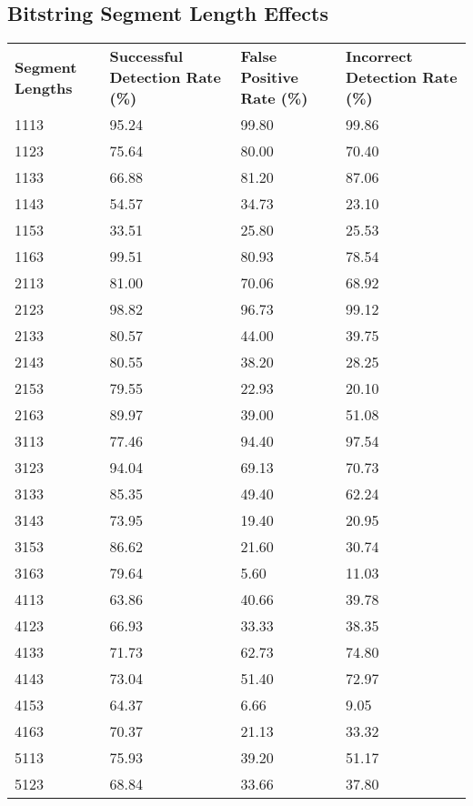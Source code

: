 \begin{appendices}
\newpage
\section{Bitstring Segment Length Effects}

\begin{longtable}{|p{1.5in}|p{1in}|p{1in}|p{1in}|}
	\hline
	\textbf{Segment Lengths} & \textbf{Successful Detection Rate (\%)} & \textbf{False Positive Rate (\%)} & \textbf{Incorrect Detection Rate (\%)}  \\
	\hhline{|=|=|=|=|}
	1113 & 95.24 & 99.80 & 99.86 \\ \hline
	1123 & 75.64 & 80.00 & 70.40 \\ \hline
	1133 & 66.88 & 81.20 & 87.06 \\ \hline
	1143 & 54.57 & 34.73 & 23.10 \\ \hline
	1153 & 33.51 & 25.80 & 25.53 \\ \hline
	1163 & 99.51 & 80.93 & 78.54 \\ \hline
	2113 & 81.00 & 70.06 & 68.92 \\ \hline
	2123 & 98.82 & 96.73 & 99.12 \\ \hline
	2133 & 80.57 & 44.00 & 39.75 \\ \hline
	2143 & 80.55 & 38.20 & 28.25 \\ \hline
	2153 & 79.55 & 22.93 & 20.10 \\ \hline
	2163 & 89.97 & 39.00 & 51.08 \\ \hline
	3113 & 77.46 & 94.40 & 97.54 \\ \hline
	3123 & 94.04 & 69.13 & 70.73 \\ \hline
	3133 & 85.35 & 49.40 & 62.24 \\ \hline
	3143 & 73.95 & 19.40 & 20.95 \\ \hline
	3153 & 86.62 & 21.60 & 30.74 \\ \hline
	3163 & 79.64 &  5.60 & 11.03 \\ \hline
	4113 & 63.86 & 40.66 & 39.78 \\ \hline
	4123 & 66.93 & 33.33 & 38.35 \\ \hline
	4133 & 71.73 & 62.73 & 74.80 \\ \hline
	4143 & 73.04 & 51.40 & 72.97 \\ \hline
	4153 & 64.37 &  6.66 &  9.05 \\ \hline
	4163 & 70.37 & 21.13 & 33.32 \\ \hline
	5113 & 75.93 & 39.20 & 51.17 \\ \hline 
	5123 & 68.84 & 33.66 & 37.80 \\ \hline

\end{longtable}
\end{appendices}
